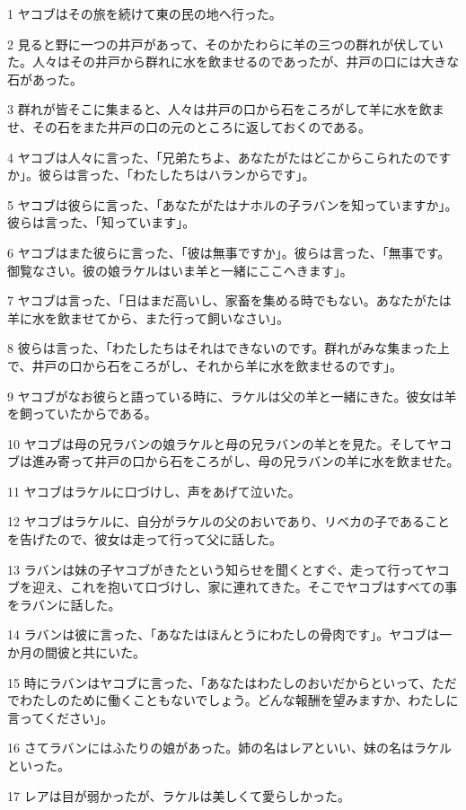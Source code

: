\par 1 ヤコブはその旅を続けて東の民の地へ行った。
\par 2 見ると野に一つの井戸があって、そのかたわらに羊の三つの群れが伏していた。人々はその井戸から群れに水を飲ませるのであったが、井戸の口には大きな石があった。
\par 3 群れが皆そこに集まると、人々は井戸の口から石をころがして羊に水を飲ませ、その石をまた井戸の口の元のところに返しておくのである。
\par 4 ヤコブは人々に言った、「兄弟たちよ、あなたがたはどこからこられたのですか」。彼らは言った、「わたしたちはハランからです」。
\par 5 ヤコブは彼らに言った、「あなたがたはナホルの子ラバンを知っていますか」。彼らは言った、「知っています」。
\par 6 ヤコブはまた彼らに言った、「彼は無事ですか」。彼らは言った、「無事です。御覧なさい。彼の娘ラケルはいま羊と一緒にここへきます」。
\par 7 ヤコブは言った、「日はまだ高いし、家畜を集める時でもない。あなたがたは羊に水を飲ませてから、また行って飼いなさい」。
\par 8 彼らは言った、「わたしたちはそれはできないのです。群れがみな集まった上で、井戸の口から石をころがし、それから羊に水を飲ませるのです」。
\par 9 ヤコブがなお彼らと語っている時に、ラケルは父の羊と一緒にきた。彼女は羊を飼っていたからである。
\par 10 ヤコブは母の兄ラバンの娘ラケルと母の兄ラバンの羊とを見た。そしてヤコブは進み寄って井戸の口から石をころがし、母の兄ラバンの羊に水を飲ませた。
\par 11 ヤコブはラケルに口づけし、声をあげて泣いた。
\par 12 ヤコブはラケルに、自分がラケルの父のおいであり、リベカの子であることを告げたので、彼女は走って行って父に話した。
\par 13 ラバンは妹の子ヤコブがきたという知らせを聞くとすぐ、走って行ってヤコブを迎え、これを抱いて口づけし、家に連れてきた。そこでヤコブはすべての事をラバンに話した。
\par 14 ラバンは彼に言った、「あなたはほんとうにわたしの骨肉です」。ヤコブは一か月の間彼と共にいた。
\par 15 時にラバンはヤコブに言った、「あなたはわたしのおいだからといって、ただでわたしのために働くこともないでしょう。どんな報酬を望みますか、わたしに言ってください」。
\par 16 さてラバンにはふたりの娘があった。姉の名はレアといい、妹の名はラケルといった。
\par 17 レアは目が弱かったが、ラケルは美しくて愛らしかった。
